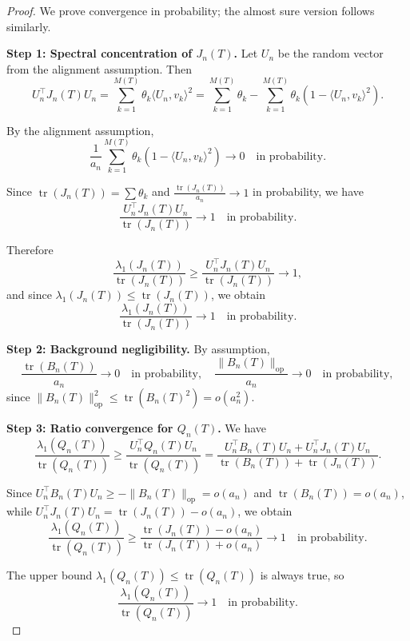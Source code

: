 \documentclass{article}
\begin{document}
\begin{proof}
We prove convergence in probability; the almost sure version follows similarly.

\textbf{Step 1: Spectral concentration of \(J_n(T)\).}
Let \(U_n\) be the random vector from the alignment assumption. Then
\[
U_n^\top J_n(T) U_n = \sum_{k=1}^{M(T)} \theta_k \langle U_n, v_k \rangle^2 = \sum_{k=1}^{M(T)} \theta_k - \sum_{k=1}^{M(T)} \theta_k \left(1 - \langle U_n, v_k \rangle^2\right).
\]

By the alignment assumption,
\[
\frac{1}{a_n} \sum_{k=1}^{M(T)} \theta_k \left(1 - \langle U_n, v_k \rangle^2\right) \to 0 \quad \text{in probability}.
\]

Since \(\operatorname{tr}(J_n(T)) = \sum \theta_k\) and \(\frac{\operatorname{tr}(J_n(T))}{a_n} \to 1\) in probability, we have
\[
\frac{U_n^\top J_n(T) U_n}{\operatorname{tr}(J_n(T))} \to 1 \quad \text{in probability}.
\]

Therefore
\[
\frac{\lambda_1(J_n(T))}{\operatorname{tr}(J_n(T))} \ge \frac{U_n^\top J_n(T) U_n}{\operatorname{tr}(J_n(T))} \to 1,
\]
and since \(\lambda_1(J_n(T)) \le \operatorname{tr}(J_n(T))\), we obtain
\[
\frac{\lambda_1(J_n(T))}{\operatorname{tr}(J_n(T))} \to 1 \quad \text{in probability}.
\]

\textbf{Step 2: Background negligibility.}
By assumption,
\[
\frac{\operatorname{tr}(B_n(T))}{a_n} \to 0 \quad \text{in probability}, \quad \frac{\|B_n(T)\|_{\mathrm{op}}}{a_n} \to 0 \quad \text{in probability},
\]
since \(\|B_n(T)\|_{\mathrm{op}}^2 \le \operatorname{tr}(B_n(T)^2) = o(a_n^2)\).

\textbf{Step 3: Ratio convergence for \(Q_n(T)\).}
We have
\[
\frac{\lambda_1(Q_n(T))}{\operatorname{tr}(Q_n(T))} \ge \frac{U_n^\top Q_n(T) U_n}{\operatorname{tr}(Q_n(T))} = \frac{U_n^\top B_n(T) U_n + U_n^\top J_n(T) U_n}{\operatorname{tr}(B_n(T)) + \operatorname{tr}(J_n(T))}.
\]

Since \(U_n^\top B_n(T) U_n \ge -\|B_n(T)\|_{\mathrm{op}} = o(a_n)\) and \(\operatorname{tr}(B_n(T)) = o(a_n)\), while \(U_n^\top J_n(T) U_n = \operatorname{tr}(J_n(T)) - o(a_n)\), we obtain
\[
\frac{\lambda_1(Q_n(T))}{\operatorname{tr}(Q_n(T))} \ge \frac{\operatorname{tr}(J_n(T)) - o(a_n)}{\operatorname{tr}(J_n(T)) + o(a_n)} \to 1 \quad \text{in probability}.
\]

The upper bound \(\lambda_1(Q_n(T)) \le \operatorname{tr}(Q_n(T))\) is always true, so
\[
\frac{\lambda_1(Q_n(T))}{\operatorname{tr}(Q_n(T))} \to 1 \quad \text{in probability}.
\]


\end{proof}
\end{document}
